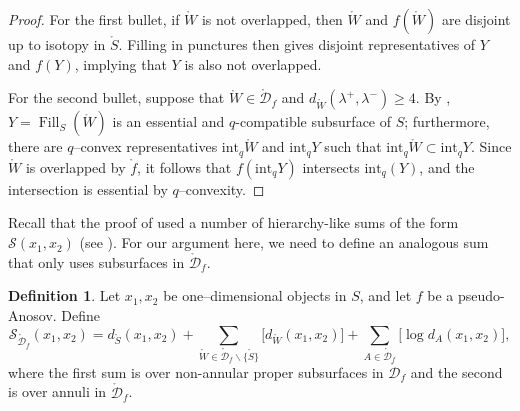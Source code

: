 \documentclass[11pt,letterpaper]{amsart}
\newcommand{\Fill}{\operatorname{Fill}}
\newcommand{\mc}{\mathcal}
\newcommand{\mr}{\mathring}
\newcommand{\bdy}{\partial} %
\newcommand{\psub}{\mr W}
\numberwithin{equation}{section}
\theoremstyle{definition}
\newtheorem{definition}[theorem]{Definition}
\renewcommand{\setminus}{\smallsetminus}
\renewcommand{\int}{\mathrm{int}}
\begin{document}
\begin{proof}
For the first bullet,  if $\mr W$ is not overlapped, then $\psub$ and $f(\psub)$ are disjoint up to isotopy in $\mr S$. Filling in punctures then gives disjoint representatives of $Y$ and $f(Y)$, implying that $Y$ is also not overlapped.



For the second bullet, suppose that $\psub \in \mr {\mc D}_f$ and  $d_{\psub}(\lambda^+,\lambda^-) \geq 4$. By , $Y = \Fill_S(\psub)$ is an essential and $q$-compatible subsurface of $S$; furthermore, there are $q$--convex representatives $\int_q \psub$ and $\int_q Y$ such that $\int_q \psub \subset \int_q Y$. Since $\psub$ is overlapped by $\mr f$, it follows that $f(\int_q Y)$ intersects $\int_q(Y)$, and the intersection is essential by $q$--convexity.
\end{proof}


Recall that the proof of  used a number of hierarchy-like sums of the form $\mc S(x_1, x_2)$ (see  ). For our argument here, we need to define an analogous sum that only uses subsurfaces in $\mr{\mc D}_f$.



\begin{definition}\label{Def:SSumDf}
Let $x_1, x_2$ be one--dimensional objects in $S$, and let $f$ be a pseudo-Anosov. Define
\[
\mc S_{\mr{\mc D}_f}(x_1, x_2) =  d_{\mr S}(x_1, x_2) + \sum_{\psub \in \mr{\mc D}_f \setminus \{ \mr S \}} \big[ d_{\psub}(x_1, x_2) \big] + \sum_{A \in \mr{\mc D}_f} \big[ \log d_A(x_1, x_2) \big],
\]
where the first sum is over non-annular proper subsurfaces in $\mr{\mc D}_f$ and the second is over annuli in $\mr{\mc D}_f$. 
\end{definition}
\end{document}
